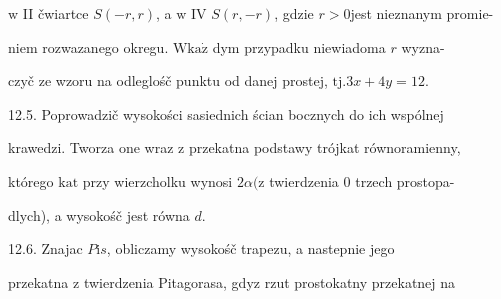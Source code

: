 \documentclass[a4paper,12pt]{article}
\begin{document}
$\mathrm{w}$ II čwiartce $S(-r,r)$, a $\mathrm{w}$ IV $S(r,-r)$, gdzie $r>0$jest nieznanym promie-

niem rozwazanego okregu. $\mathrm{W} \mathrm{k}\mathrm{a}\dot{\mathrm{z}}$ dym przypadku niewiadoma $r$ wyzna-

czyč ze wzoru na odleglośč punktu od danej prostej, $\mathrm{t}\mathrm{j}. 3x+4y=12.$

12.5. Poprowadzič wysokości sasiednich ścian bocznych do ich wspólnej

krawedzi. Tworza one wraz $\mathrm{z}$ przekatna podstawy trójkat równoramienny,

którego $\mathrm{k}\mathrm{a}\mathrm{t}$ przy wierzcholku wynosi $ 2\alpha (\mathrm{z}$ twierdzenia $0$ trzech prostopa-

dlych), a wysokośč jest równa $d.$

12.6. Znajac $P \mathrm{i} s$, obliczamy wysokośč trapezu, a nastepnie jego

przekatna $\mathrm{z}$ twierdzenia Pitagorasa, gdyz rzut prostokatny przekatnej na
\end{document}
